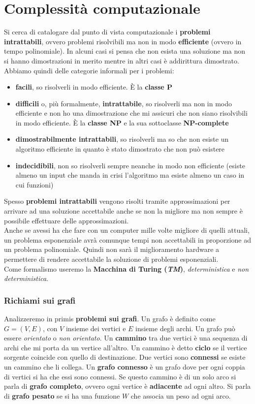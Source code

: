 \chapter{Complessità computazionale}

\label{Capitolo 2}
Si cerca di catalogare dal punto di vista computazionale i \textbf{problemi
	intrattabili}, ovvero problemi risolvibili ma non in modo \textbf{efficiente}
(ovvero in tempo polinomiale). In alcuni casi si pensa che non esista una
soluzione ma non si hanno dimostrazioni in merito mentre in altri casi è
addirittura dimostrato. Abbiamo quindi delle categorie informali per i problemi:
\begin{itemize}
	\item \textbf{facili}, so risolverli in modo efficiente. È la \textbf{classe P}
	\item \textbf{difficili} o, più formalmente, \textbf{intrattabile}, so
	      risolverli ma non in modo efficiente e non ho una 
	      dimostrazione che mi assicuri che non siano risolvibili in modo efficiente. È
	      la \textbf{classe NP} e la sua sottoclasse \textbf{NP-complete}
	\item \textbf{dimostrabilmente intrattabili}, so risolverli ma so che non esiste
	      un algoritmo efficiente in quanto è stato dimostrato che non può esistere
	\item \textbf{indecidibili}, non so risolverli sempre neanche in modo non
	      efficiente (esiste almeno un input che manda in crisi l'algoritmo ma esiste
	      almeno un caso in cui funzioni)
\end{itemize}
Spesso \textbf{problemi intrattabili} vengono risolti tramite approssimazioni
per arrivare ad una soluzione accettabile anche se non la migliore ma non sempre
è possibile effettuare delle approssimazioni.\\
Anche se avessi ha che fare con un computer mille volte migliore di quelli
attuali, un problema esponenziale avrà comunque tempi non accettabili in
proporzione ad un problema polinomiale. Quindi non sarà il miglioramento
hardware a permettere di rendere accettabile la soluzione di problemi
esponenziali.\\
Come formalismo useremo la \textbf{Macchina di Turing (\textit{TM})},
\textit{deterministica} e \textit{non deterministica}. 
\subsection{Richiami sui grafi}
Analizzeremo in primis
\textbf{problemi sui grafi}. Un grafo è definito come $G=(V,E)$, con $V$ insieme
dei vertici e $E$ insieme degli archi. Un grafo può essere \textit{orientato} o
\textit{non orientato}. Un \textbf{cammino} tra due vertici è una sequenza di
archi che mi porta da un vertice all'altro. Un cammino è detto \textbf{ciclo} se
il vertice sorgente coincide con quello di destinazione. Due vertici sono
\textbf{connessi} se esiste un cammino che li collega. Un \textbf{grafo
connesso} è un grafo dove per ogni coppia di vertici si ha che essi sono
connessi. Se questo cammino è di un solo arco si parla di \textbf{grafo
	completo}, ovvero ogni vertice è \textbf{adiacente} ad ogni altro. Si parla di
\textbf{grafo pesato} se si ha una funzione $W$ che associa un peso ad ogni
arco. \\
